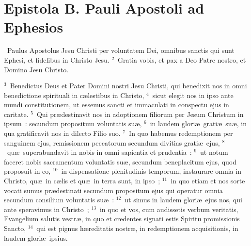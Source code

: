 {\centering \section*{Epistola B. Pauli Apostoli ad Ephesios}}\thispagestyle{empty}

~Paulus Apostolus Jesu Christi per voluntatem Dei, omnibus sanctis qui sunt Ephesi, et fidelibus in Christo Jesu.
${}^{2}$~Gratia vobis, et pax a Deo Patre nostro, et Domino Jesu Christo.


${}^{3}$~Benedictus Deus et Pater Domini nostri Jesu Christi, qui benedixit nos in omni benedictione spirituali in c\ae lestibus in Christo,
${}^{4}$~sicut elegit nos in ipso ante mundi constitutionem, ut essemus sancti et immaculati in conspectu ejus in caritate.
${}^{5}$~Qui pr\ae destinavit nos in adoptionem filiorum per Jesum Christum in ipsum~: secundum propositum voluntatis su\ae ,
${}^{6}$~in laudem glori\ae\ grati\ae\ su\ae , in qua gratificavit nos in dilecto Filio suo.
${}^{7}$~In quo habemus redemptionem per sanguinem ejus, remissionem peccatorum secundum divitias grati\ae\ ejus,
${}^{8}$~qu\ae\ superabundavit in nobis in omni sapientia et prudentia~:
${}^{9}$~ut notum faceret nobis sacramentum voluntatis su\ae , secundum beneplacitum ejus, quod proposuit in eo,
${}^{10}$~in dispensatione plenitudinis temporum, instaurare omnia in Christo, qu\ae\ in c\ae lis et qu\ae\ in terra sunt, in ipso~;
${}^{11}$~in quo etiam et nos sorte vocati sumus pr\ae destinati secundum propositum ejus qui operatur omnia secundum consilium voluntatis su\ae~:
${}^{12}$~ut simus in laudem glori\ae\ ejus nos, qui ante speravimus in Christo~;
${}^{13}$~in quo et vos, cum audissetis verbum veritatis, Evangelium salutis vestr\ae , in quo et credentes signati estis Spiritu promissionis Sancto,
${}^{14}$~qui est pignus h\ae reditatis nostr\ae , in redemptionem acquisitionis, in laudem glori\ae\ ipsius.


